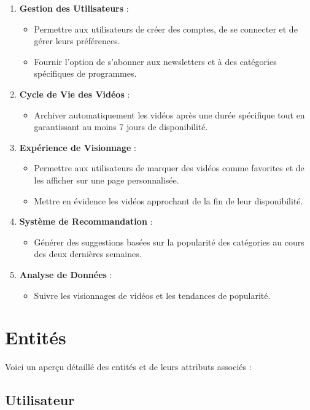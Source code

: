 \documentclass{article}
\begin{document}
\begin{enumerate}
    \item \textbf{Gestion des Utilisateurs} :
    \begin{itemize}
        \item Permettre aux utilisateurs de créer des comptes, de se connecter et de gérer leurs préférences.
        \item Fournir l'option de s'abonner aux newsletters et à des catégories spécifiques de programmes.
    \end{itemize}
    \item \textbf{Cycle de Vie des Vidéos} :
    \begin{itemize}
        \item Archiver automatiquement les vidéos après une durée spécifique tout en garantissant au moins 7 jours de disponibilité.
    \end{itemize}
    \item \textbf{Expérience de Visionnage} :
    \begin{itemize}
        \item Permettre aux utilisateurs de marquer des vidéos comme favorites et de les afficher sur une page personnalisée.
        \item Mettre en évidence les vidéos approchant de la fin de leur disponibilité.
    \end{itemize}
    \item \textbf{Système de Recommandation} :
    \begin{itemize}
        \item Générer des suggestions basées sur la popularité des catégories au cours des deux dernières semaines.
    \end{itemize}
    \item \textbf{Analyse de Données} :
    \begin{itemize}
        \item Suivre les visionnages de vidéos et les tendances de popularité.
    \end{itemize}
\end{enumerate}

\section{Entités}

Voici un aperçu détaillé des entités et de leurs attributs associés :

\subsection{Utilisateur}
\end{document}
